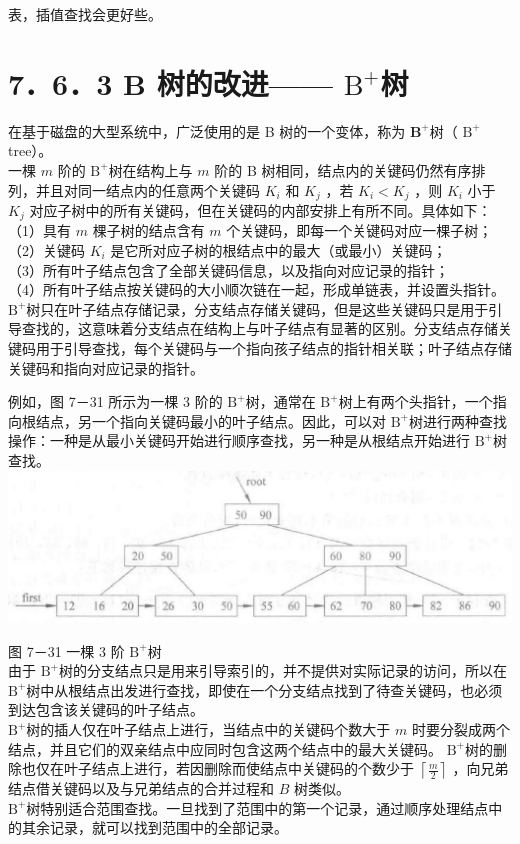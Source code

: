 \documentclass[10pt]{article}
\begin{document}
表，插值查找会更好些。

\section*{7．6．3 B 树的改进—— $\mathrm{B}^{+}$树}
在基于磁盘的大型系统中，广泛使用的是 B 树的一个变体，称为 $\mathbf{B}^{+}$树（ $\mathrm{B}^{+}$tree）。\\
一棵 $m$ 阶的 $\mathrm{B}^{+}$树在结构上与 $m$ 阶的 B 树相同，结点内的关键码仍然有序排列，并且对同一结点内的任意两个关键码 $K_{i}$ 和 $K_{j}$ ，若 $K_{i}<K_{j}$ ，则 $K_{i}$ 小于 $K_{j}$ 对应子树中的所有关键码，但在关键码的内部安排上有所不同。具体如下：\\
（1）具有 $m$ 棵子树的结点含有 $m$ 个关键码，即每一个关键码对应一棵子树；\\
（2）关键码 $K_{i}$ 是它所对应子树的根结点中的最大（或最小）关键码；\\
（3）所有叶子结点包含了全部关键码信息，以及指向对应记录的指针；\\
（4）所有叶子结点按关键码的大小顺次链在一起，形成单链表，并设置头指针。\\
$\mathrm{B}^{+}$树只在叶子结点存储记录，分支结点存储关键码，但是这些关键码只是用于引导查找的，这意味着分支结点在结构上与叶子结点有显著的区别。分支结点存储关键码用于引导查找，每个关键码与一个指向孩子结点的指针相关联；叶子结点存储关键码和指向对应记录的指针。

例如，图 7－31 所示为一棵 3 阶的 $\mathrm{B}^{+}$树，通常在 $\mathrm{B}^{+}$树上有两个头指针，一个指向根结点，另一个指向关键码最小的叶子结点。因此，可以对 $\mathrm{B}^{+}$树进行两种查找操作：一种是从最小关键码开始进行顺序查找，另一种是从根结点开始进行 $\mathrm{B}^{+}$树查找。\\
\includegraphics[max width=\textwidth, center]{2025_06_06_704745ea57b15b2333e5g-263}

图 7－31 一棵 3 阶 $\mathrm{B}^{+}$树\\
由于 $\mathrm{B}^{+}$树的分支结点只是用来引导索引的，并不提供对实际记录的访问，所以在 $\mathrm{B}^{+}$树中从根结点出发进行查找，即使在一个分支结点找到了待查关键码，也必须到达包含该关键码的叶子结点。\\
$\mathrm{B}^{+}$树的插人仅在叶子结点上进行，当结点中的关键码个数大于 $m$ 时要分裂成两个结点，并且它们的双亲结点中应同时包含这两个结点中的最大关键码。 $\mathrm{B}^{+}$树的删除也仅在叶子结点上进行，若因删除而使结点中关键码的个数少于 $\left\lceil\frac{m}{2}\right\rceil$ ，向兄弟结点借关键码以及与兄弟结点的合并过程和 $B$ 树类似。\\
$\mathrm{B}^{+}$树特别适合范围查找。一旦找到了范围中的第一个记录，通过顺序处理结点中的其余记录，就可以找到范围中的全部记录。
\end{document}
